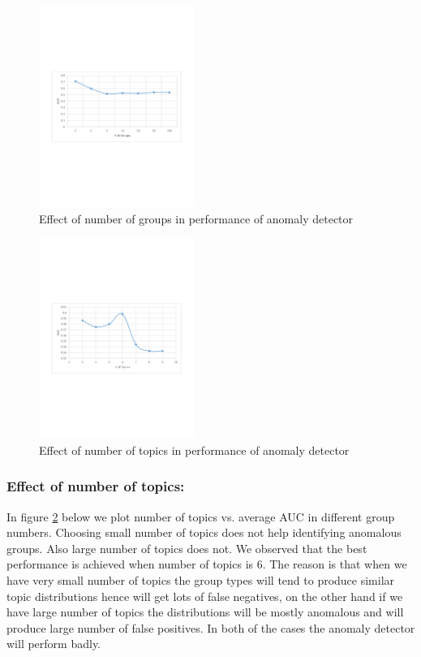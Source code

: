 \documentclass[letterpaper]{article}
\begin{document}
\begin{figure}[t]
\begin{center}
\includegraphics[bb = 70 270 550 530,clip=true,width=0.45\textwidth]{ResultGroupVsAUC.pdf}
\end{center}
\caption{Effect of number of groups in performance of anomaly detector}\label{effectGroups}
\end{figure}

\begin{figure}[t]
\begin{center}
\includegraphics[bb = 70 270 550 530,clip=true,width=0.45\textwidth]{ResultTopicVsAuc.pdf}
\end{center}
\caption{Effect of number of topics in performance of anomaly detector}\label{effectTopics}
\end{figure}


\subsubsection{Effect of number of topics:} In figure \ref{effectTopics} below we plot number of topics vs. average AUC in different group numbers. Choosing small number of topics does not help identifying anomalous groups. Also large number of topics does not. We observed that the best performance is achieved when number of topics is 6. The reason is that when we have very small number of topics the group types will tend to produce similar topic distributions hence will get lots of false negatives, on the other hand if we have large number of topics the distributions will be mostly anomalous and will produce large number of false positives. In both of the cases the anomaly detector will perform badly.
\end{document}
